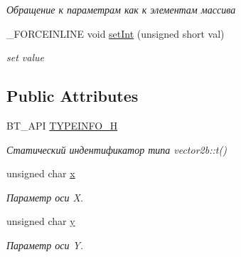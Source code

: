 \begin{DoxyCompactItemize}
\begin{DoxyCompactList}\small\item\em Обращение к параметрам как к элементам массива \end{DoxyCompactList}\item 
\hypertarget{classbt_1_1vector2b_a1065829a547cb1e07f08268e0e2f149b}{\-\_\-\-F\-O\-R\-C\-E\-I\-N\-L\-I\-N\-E void \hyperlink{classbt_1_1vector2b_a1065829a547cb1e07f08268e0e2f149b}{set\-Int} (unsigned short val)}\label{classbt_1_1vector2b_a1065829a547cb1e07f08268e0e2f149b}

\begin{DoxyCompactList}\small\item\em set value \end{DoxyCompactList}\end{DoxyCompactItemize}
\subsection*{Public Attributes}
\begin{DoxyCompactItemize}
\item 
\hypertarget{classbt_1_1vector2b_a9e5eb54a69ad038ed8b5fbc94f2638f4}{B\-T\-\_\-\-A\-P\-I \hyperlink{classbt_1_1vector2b_a9e5eb54a69ad038ed8b5fbc94f2638f4}{T\-Y\-P\-E\-I\-N\-F\-O\-\_\-\-H}}\label{classbt_1_1vector2b_a9e5eb54a69ad038ed8b5fbc94f2638f4}

\begin{DoxyCompactList}\small\item\em Статический индентификатор типа vector2b\-::t() \end{DoxyCompactList}\item 
\hypertarget{classbt_1_1vector2b_a036641643428d4bcc0788b8da1bf5251}{unsigned char \hyperlink{classbt_1_1vector2b_a036641643428d4bcc0788b8da1bf5251}{x}}\label{classbt_1_1vector2b_a036641643428d4bcc0788b8da1bf5251}

\begin{DoxyCompactList}\small\item\em Параметр оси X. \end{DoxyCompactList}\item 
\hypertarget{classbt_1_1vector2b_a129f7c1462184bacf772c3eb105c5e8d}{unsigned char \hyperlink{classbt_1_1vector2b_a129f7c1462184bacf772c3eb105c5e8d}{y}}\label{classbt_1_1vector2b_a129f7c1462184bacf772c3eb105c5e8d}

\begin{DoxyCompactList}\small\item\em Параметр оси Y. \end{DoxyCompactList}\end{DoxyCompactItemize}


